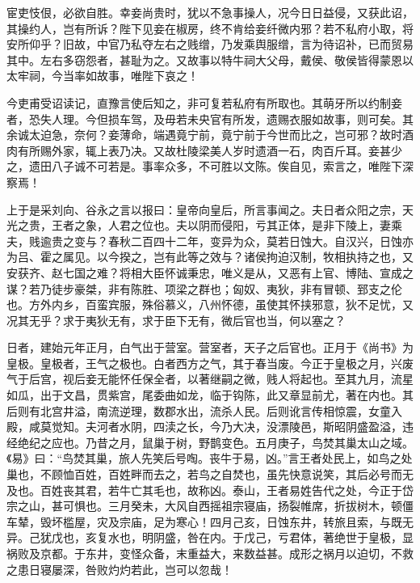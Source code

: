 \documentclass[12pt,UTF8]{ctexbook}
\begin{document}
宦吏忮佷，必欲自胜。幸妾尚贵时，犹以不急事操人，况今日日益侵，又获此诏，其操约人，岂有所诉？陛下见妾在椒房，终不肯给妾纤微内邪？若不私府小取，将安所仰乎？旧故，中官乃私夺左右之贱缯，乃发乘舆服缯，言为待诏补，已而贸易其中。左右多窃怨者，甚耻为之。又故事以特牛祠大父母，戴侯、敬侯皆得蒙恩以太牢祠，今当率如故事，唯陛下哀之！



今吏甫受诏读记，直豫言使后知之，非可复若私府有所取也。其萌牙所以约制妾者，恐失人理。今但损车驾，及毋若未央官有所发，遗赐衣服如故事，则可矣。其余诚太迫急，奈何？妾薄命，端遇竟宁前，竟宁前于今世而比之，岂可邪？故时酒肉有所赐外家，辄上表乃决。又故杜陵梁美人岁时遗酒一石，肉百斤耳。妾甚少之，遗田八子诚不可若是。事率众多，不可胜以文陈。俟自见，索言之，唯陛下深察焉！



上于是采刘向、谷永之言以报曰：皇帝向皇后，所言事闻之。夫日者众阳之宗，天光之贵，王者之象，人君之位也。夫以阴而侵阳，亏其正体，是非下陵上，妻乘夫，贱逾贵之变与？春秋二百四十二年，变异为众，莫若日蚀大。自汉兴，日蚀亦为吕、霍之属见。以今揆之，岂有此等之效与？诸侯拘迫汉制，牧相执持之也，又安获齐、赵七国之难？将相大臣怀诚秉忠，唯义是从，又恶有上官、博陆、宣成之谋？若乃徒步豪桀，非有陈胜、项梁之群也；匈奴、夷狄，非有冒顿、郅支之伦也。方外内乡，百蛮宾服，殊俗慕义，八州怀德，虽使其怀挟邪意，狄不足忧，又况其无乎？求于夷狄无有，求于臣下无有，微后官也当，何以塞之？



日者，建始元年正月，白气出于营室。营室者，天子之后官也。正月于《尚书》为皇极。皇极者，王气之极也。白者西方之气，其于春当废。今正于皇极之月，兴废气于后宫，视后妾无能怀任保全者，以著继嗣之微，贱人将起也。至其九月，流星如瓜，出于文昌，贯紫宫，尾委曲如龙，临于钩陈，此又章显前尤，著在内也。其后则有北宫井溢，南流逆理，数郡水出，流杀人民。后则讹言传相惊震，女童入殿，咸莫觉知。夫河者水阴，四渎之长，今乃大决，没漂陵邑，斯昭阴盛盈溢，违经绝纪之应也。乃昔之月，鼠巢于树，野鹊变色。五月庚子，鸟焚其巢太山之域。《易》曰：“鸟焚其巢，旅人先笑后号啕。丧牛于易，凶。”言王者处民上，如鸟之处巢也，不顾恤百姓，百姓畔而去之，若鸟之自焚也，虽先快意说笑，其后必号而无及也。百姓丧其君，若牛亡其毛也，故称凶。泰山，王者易姓告代之处，今正于岱宗之山，甚可惧也。三月癸未，大风自西摇祖宗寝庙，扬裂帷席，折拔树木，顿僵车辇，毁坏槛屋，灾及宗庙，足为寒心！四月己亥，日蚀东井，转旅且索，与既无异。己犹戊也，亥复水也，明阴盛，咎在内。于戊己，亏君体，著绝世于皇极，显祸败及京都。于东井，变怪众备，末重益大，来数益甚。成形之祸月以迫切，不救之患日寝屡深，咎败灼灼若此，岂可以忽哉！
\end{document}
